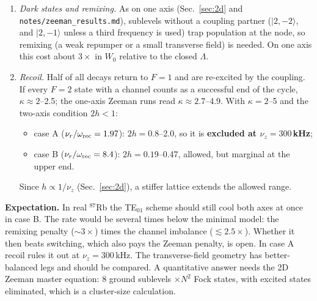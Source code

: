 \documentclass[11pt,a4paper]{article}
\newcommand{\ket}[1]{|#1\rangle}
\begin{document}
\begin{enumerate}
\item \emph{Dark states and remixing.} As on one axis (Sec.~\ref{sec:2d} and \texttt{notes/zeeman\_results.md}), sublevels without a coupling partner ($\ket{2,-2}$, and $\ket{2,-1}$ unless a third frequency is used) trap population at the node, so remixing (a weak repumper or a small transverse field) is needed. On one axis this cost about $3\times$ in $W_0$ relative to the closed $\Lambda$.
\item \emph{Recoil.} Half of all decays return to $F=1$ and are re-excited by the coupling. If every $F=2$ state with a channel counts as a successful end of the cycle, $\kappa\approx2$--2.5; the one-axis Zeeman runs read $\kappa\approx2.7$--4.9. With $\kappa=2$--5 and the two-axis condition $2h<1$:
  \begin{itemize}
  \item case A ($\nu_r/\omega_{\rm rec}=1.97$): $2h=0.8$--2.0, so it is \textbf{excluded at $\nu_z=300$\,kHz};
  \item case B ($\nu_r/\omega_{\rm rec}=8.4$): $2h=0.19$--0.47, allowed, but marginal at the upper end.
  \end{itemize}
  Since $h\propto1/\nu_z$ (Sec.~\ref{sec:2d}), a stiffer lattice extends the allowed range.
\end{enumerate}
\textbf{Expectation.} In real $^{87}$Rb the TE$_{01}$ scheme should still cool both axes at once in case B. The rate would be several times below the minimal model: the remixing penalty ($\sim3\times$) times the channel imbalance ($\lesssim2.5\times$). Whether it then beats switching, which also pays the Zeeman penalty, is open. In case A recoil rules it out at $\nu_z=300$\,kHz. The transverse-field geometry has better-balanced legs and should be compared. A quantitative answer needs the 2D Zeeman master equation: 8 ground sublevels $\times N^2$ Fock states, with excited states eliminated, which is a cluster-size calculation.
\end{document}
